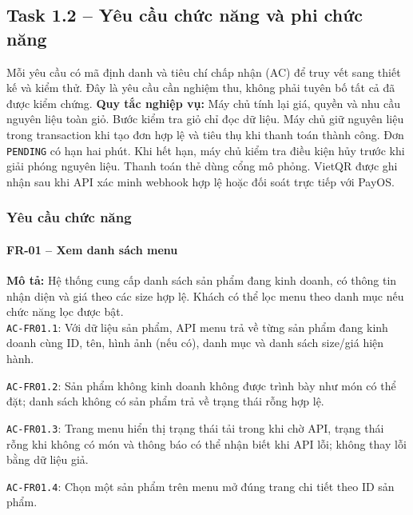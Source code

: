 \subsection{Task 1.2 -- Yêu cầu chức năng và phi chức năng}
Mỗi yêu cầu có mã định danh và tiêu chí chấp nhận (AC) để truy vết sang thiết kế và kiểm thử. Đây là yêu cầu cần nghiệm thu, không phải tuyên bố tất cả đã được kiểm chứng.
\textbf{Quy tắc nghiệp vụ:} Máy chủ tính lại giá, quyền và nhu cầu nguyên liệu toàn giỏ. Bước kiểm tra giỏ chỉ đọc dữ liệu. Máy chủ giữ nguyên liệu trong transaction khi tạo đơn hợp lệ và tiêu thụ khi thanh toán thành công. Đơn \texttt{PENDING} có hạn hai phút. Khi hết hạn, máy chủ kiểm tra điều kiện hủy trước khi giải phóng nguyên liệu. Thanh toán thẻ dùng cổng mô phỏng. VietQR được ghi nhận sau khi API xác minh webhook hợp lệ hoặc đối soát trực tiếp với PayOS.
\subsubsection{Yêu cầu chức năng}
\paragraph{FR-01 -- Xem danh sách menu}
\textbf{Mô tả:} Hệ thống cung cấp danh sách sản phẩm đang kinh doanh, có thông tin nhận diện và giá theo các size hợp lệ. Khách có thể lọc menu theo danh mục nếu chức năng lọc được bật.\\
\noindent\texttt{AC-FR01.1}: Với dữ liệu sản phẩm, API menu trả về từng sản phẩm đang kinh doanh cùng ID, tên, hình ảnh (nếu có), danh mục và danh sách size/giá hiện hành.\par
\noindent\texttt{AC-FR01.2}: Sản phẩm không kinh doanh không được trình bày như món có thể đặt; danh sách không có sản phẩm trả về trạng thái rỗng hợp lệ.\par
\noindent\texttt{AC-FR01.3}: Trang menu hiển thị trạng thái tải trong khi chờ API, trạng thái rỗng khi không có món và thông báo có thể nhận biết khi API lỗi; không thay lỗi bằng dữ liệu giả.\par
\noindent\texttt{AC-FR01.4}: Chọn một sản phẩm trên menu mở đúng trang chi tiết theo ID sản phẩm.\par

